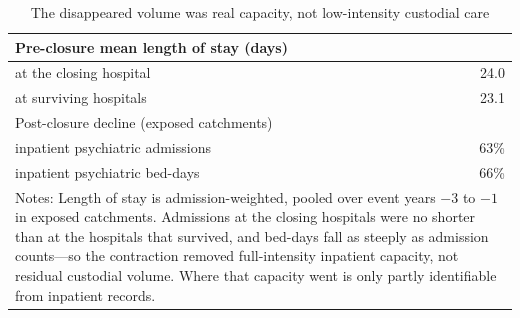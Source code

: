 \begin{table}[!htbp]\centering
\caption{The disappeared volume was real capacity, not low-intensity custodial care}
\label{tab:psych-intensity}
\small
\begin{tabular}{lr}
\toprule
Pre-closure mean length of stay (days) & \\
\midrule
\quad at the closing hospital & 24.0 \\
\quad at surviving hospitals & 23.1 \\
\midrule
Post-closure decline (exposed catchments) & \\
\quad inpatient psychiatric admissions & 63\% \\
\quad inpatient psychiatric bed-days & 66\% \\
\bottomrule
\multicolumn{2}{p{0.80\textwidth}}{\footnotesize Notes: Length of stay is admission-weighted, pooled over event years $-3$ to $-1$ in exposed catchments. Admissions at the closing hospitals were no shorter than at the hospitals that survived, and bed-days fall as steeply as admission counts---so the contraction removed full-intensity inpatient capacity, not residual custodial volume. Where that capacity went is only partly identifiable from inpatient records.}\\
\end{tabular}
\end{table}
